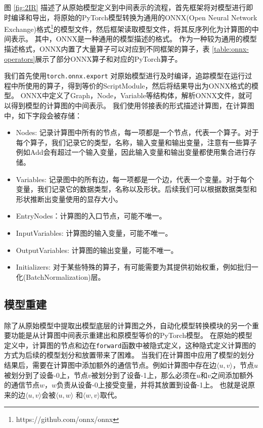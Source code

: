 图 \ref{fig:2IR} 描述了从原始模型定义到中间表示的流程，首先框架将对模型进行即时编译和导出，将原始的PyTorch模型转换为通用的ONNX(Open Neural Network Exchange)格式\footnote[1]{https://github.com/onnx/onnx}的模型文件，然后框架读取模型文件，将其反序列化为计算图的中间表示。
其中，ONNX是一种通用的模型描述的格式。
作为一种较为通用的模型描述格式，ONNX内置了大量算子可以对应到不同框架的算子，表 \ref{table:onnx-operators}展示了部分ONNX算子和对应的PyTorch算子。



我们首先使用\texttt{torch.onnx.export} 对原始模型进行及时编译，追踪模型在运行过程中所使用的算子，得到等价的ScriptModule，然后将结果导出为ONNX格式的模型。
ONNX中定义了Graph，Node，Variable等结构体，解析ONNX文件，就可以得到模型的计算图的中间表示。
我们使用邻接表的形式描述计算图，在计算图中，如下字段会被存储：
\begin{itemize}
	\item Nodes: 记录计算图中所有的节点，每一项都是一个节点，代表一个算子。对于每个算子，我们记录它的类型，名称，输入变量和输出变量，注意有一些算子例如Add会有超过一个输入变量，因此输入变量和输出变量都使用集合进行存储。
	\item Variables: 记录图中的所有边，每一项都是一个边，代表一个变量。对于每个变量，我们记录它的数据类型，名称以及形状。后续我们可以根据数据类型和形状推断出变量使用的显存大小。
	\item EntryNodes：计算图的入口节点，可能不唯一。
	\item InputVariables: 计算图的输入变量，可能不唯一。
	\item OutputVariables: 计算图的输出变量，可能不唯一。
	\item Initializers: 对于某些特殊的算子，有可能需要为其提供初始权重，例如批归一化(BatchNormalization)层。
\end{itemize}

\subsection{模型重建}
除了从原始模型中提取出模型底层的计算图之外，自动化模型转换模块的另一个重要功能是从计算图中间表示重建出和原模型等价的PyTorch模型。
在原始的模型定义中，计算图的节点和边在\texttt{forward}函数中被隐式定义，这种隐式定义计算图的方式为后续的模型划分和放置带来了困难。
当我们在计算图中应用了模型的划分结果后，需要在计算图中添加额外的通信节点。例如计算图中存在边$\langle u,v\rangle$，节点$u$被划分到了设备-0上，节点$v$被划分到了设备-1上，那么必须在$u$和$v$之间添加额外的通信节点$w$，$w$负责从设备-0上接受变量，并将其放置到设备-1上。
也就是说原来的边$\langle u,v\rangle$会被$\langle u, w\rangle$ 和$\langle w,v\rangle$取代。

